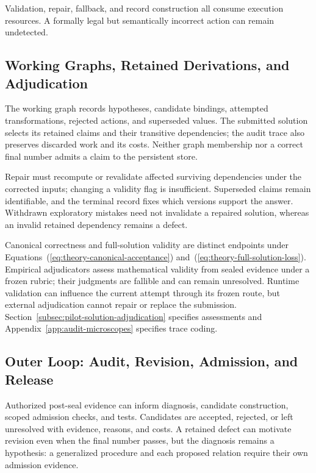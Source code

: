 \documentclass[10pt]{article} %
\renewcommand{\eqref}[1]{\textup{(\ref{#1})}}
\providecommand{\1}{\mathbf{1}}  %
\theoremstyle{remark}
\theoremstyle{definition}
\begin{document}
Validation, repair, fallback, and record construction all consume
execution resources. A formally legal but semantically incorrect action
can remain undetected.

\subsection{Working Graphs, Retained Derivations, and Adjudication}
\label{subsec:courtroom-derivations}

The working graph records hypotheses, candidate bindings, attempted
transformations, rejected actions, and superseded values. The submitted
solution selects its retained claims and their transitive dependencies;
the audit trace also preserves discarded work and its costs. Neither
graph membership nor a correct final number admits a claim to the
persistent store.

Repair must recompute or revalidate affected surviving dependencies under
the corrected inputs; changing a validity flag is insufficient.
Superseded claims remain identifiable, and the terminal record fixes
which versions support the answer. Withdrawn exploratory mistakes need
not invalidate a repaired solution, whereas an invalid retained
dependency remains a defect.

Canonical correctness and full-solution validity are distinct endpoints
under Equations~\eqref{eq:theory-canonical-acceptance}
and~\eqref{eq:theory-full-solution-loss}. Empirical adjudicators assess
mathematical validity from sealed evidence under a frozen rubric; their
judgments are fallible and can remain unresolved. Runtime validation can
influence the current attempt through its frozen route, but external
adjudication cannot repair or replace the submission.
Section~\ref{subsec:pilot-solution-adjudication} specifies assessments and
Appendix~\ref{app:audit-microscopes} specifies trace coding.

\subsection{Outer Loop: Audit, Revision, Admission, and Release}
\label{subsec:courtroom-outer-loop}

Authorized post-seal evidence can inform diagnosis, candidate
construction, scoped admission checks, and tests. Candidates are
accepted, rejected, or left unresolved with evidence, reasons, and
costs. A retained defect can motivate revision even when the final number
passes, but the diagnosis remains a hypothesis: a generalized procedure
and each proposed relation require their own admission evidence.
\end{document}
